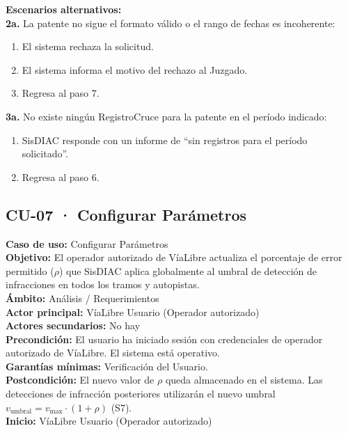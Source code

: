 \documentclass[12pt,letterpaper]{article}
\begin{document}
\noindent \textbf{Escenarios alternativos:} \\
\textbf{2a.} La patente no sigue el formato válido o el rango de fechas es incoherente:
\begin{enumerate}[nosep]
	\item[2a1.] El sistema rechaza la solicitud.
	\item[2a2.] El sistema informa el motivo del rechazo al Juzgado.
	\item[2a3.] Regresa al paso 7.
\end{enumerate}
\textbf{3a.} No existe ningún RegistroCruce para la patente en el período indicado:
\begin{enumerate}[nosep]
	\item[3a1.] SisDIAC responde con un informe de ``sin registros para el período solicitado''.
	\item[3a2.] Regresa al paso 6.
\end{enumerate}


\newpage
\subsection{CU-07 · Configurar Parámetros}

\noindent \textbf{Caso de uso:} Configurar Parámetros \\
\textbf{Objetivo:} El operador autorizado de VíaLibre actualiza el porcentaje de error permitido ($\rho$) que SisDIAC aplica globalmente al umbral de detección de infracciones en todos los tramos y autopistas. \\
\textbf{Ámbito:} Análisis / Requerimientos \\
\textbf{Actor principal:} VíaLibre Usuario (Operador autorizado) \\
\textbf{Actores secundarios:} No hay \\
\textbf{Precondición:} El usuario ha iniciado sesión con credenciales de operador autorizado de VíaLibre. El sistema está operativo. \\
\textbf{Garantías mínimas:} Verificación del Usuario. \\
\textbf{Postcondición:} El nuevo valor de $\rho$ queda almacenado en el sistema. Las detecciones de infracción posteriores utilizarán el nuevo umbral $v_{\text{umbral}} = v_{\text{max}} \cdot (1 + \rho)$ (S7). \\
\textbf{Inicio:} VíaLibre Usuario (Operador autorizado) \\
\end{document}

